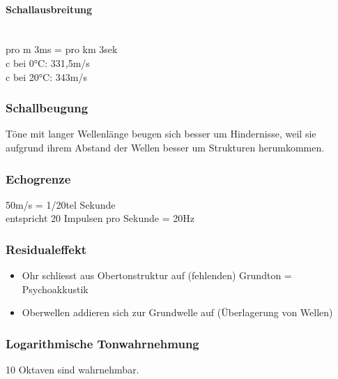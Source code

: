     \paragraph*{Schallausbreitung}~\\
pro m 3ms = pro km 3sek\\
c bei 0°C: 331,5m/s\\
c bei 20°C: 343m/s


    \subsubsection{Schallbeugung}
        Töne mit langer Wellenlänge beugen sich besser um Hindernisse, weil sie aufgrund ihrem Abstand der Wellen besser um Strukturen herumkommen. 


    \subsubsection{Echogrenze}
        50m/s = 1/20tel Sekunde\\
entspricht 20 Impulsen pro Sekunde = 20Hz


    \subsubsection{Residualeffekt}
    \begin{itemize}
        \item Ohr schliesst aus Obertonstruktur auf (fehlenden) Grundton = Psychoakkustik
        \item Oberwellen addieren sich zur Grundwelle auf (Überlagerung von Wellen)
    \end{itemize}


    \subsubsection{Logarithmische Tonwahrnehmung}
        10 Oktaven sind wahrnehmbar.
